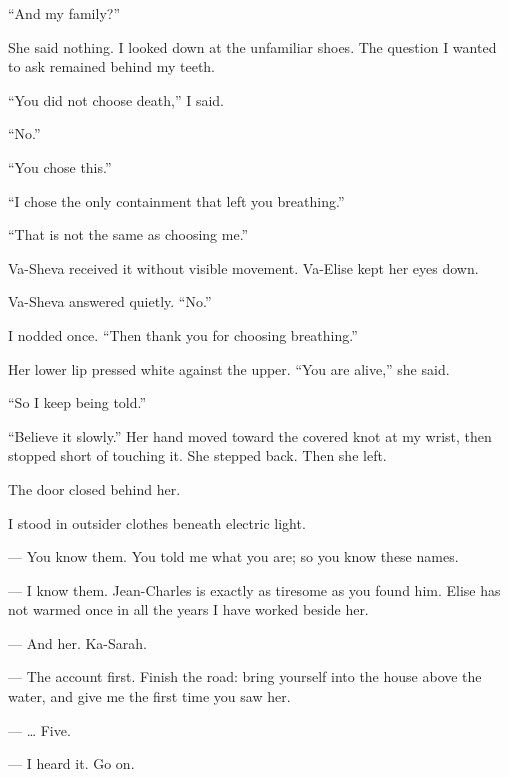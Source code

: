 ``And my family?''\par

She said nothing. I looked down at the unfamiliar shoes. The question I wanted to ask remained behind my teeth.\par

``You did not choose death,'' I said.\par

``No.''\par

``You chose this.''\par

``I chose the only containment that left you breathing.''\par

``That is not the same as choosing me.''\par

Va-Sheva received it without visible movement. Va-Elise kept her eyes down.\par

Va-Sheva answered quietly. ``No.''\par

I nodded once. ``Then thank you for choosing breathing.''\par

Her lower lip pressed white against the upper. ``You are alive,'' she said.\par

``So I keep being told.''\par

``Believe it slowly.'' Her hand moved toward the covered knot at my wrist, then stopped short of touching it. She stepped back. Then she left.\par

The door closed behind her.\par

I stood in outsider clothes beneath electric light.\par

\ornament

\begin{room}

--- You know them. You told me what you are; so you know these names.

--- I know them. Jean-Charles is exactly as tiresome as you found him. Elise has not warmed once in all the years I have worked beside her.

--- And her. Ka-Sarah.

--- The account first. Finish the road: bring yourself into the house above the water, and give me the first time you saw her.

--- \ldots{} Five.

--- I heard it. Go on.

\end{room}

